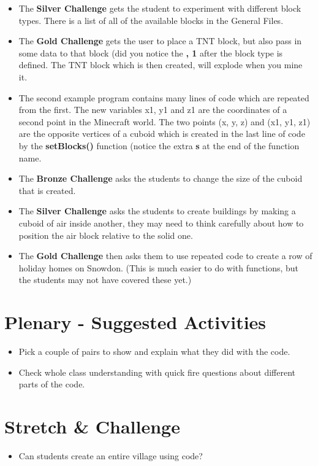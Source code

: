 \documentclass{geocraft-lesson-plan}
\begin{document}
\begin{itemize}
\item The \textbf{Silver Challenge} gets the student to experiment with different block types. There is a list of all of
  the available blocks in the General Files.
\item The \textbf{Gold Challenge} gets the user to place a TNT block, but also pass in some data to that block (did you
  notice the \textbf{, 1} after the block type is defined. The TNT block which is then created, will explode when you
  mine it.
\item The second example program contains many lines of code which are repeated from the first. The new variables x1, y1
  and z1 are the coordinates of a second point in the Minecraft world. The two points (x, y, z) and (x1, y1, z1) are the
  opposite vertices of a cuboid which is created in the last line of code by the \textbf{setBlocks()} function (notice
  the extra \textbf{s} at the end of the function name.
\item The \textbf{Bronze Challenge} asks the students to change the size of the cuboid that is created.
\item The \textbf{Silver Challenge} asks the students to create buildings by making a cuboid of air inside another, they
  may need to think carefully about how to position the air block relative to the solid one.
\item The \textbf{Gold Challenge} then asks them to use repeated code to create a row of holiday homes on Snowdon. (This
  is much easier to do with functions, but the students may not have covered these yet.)
\end{itemize}

\section*{Plenary - Suggested Activities}
\begin{itemize}
\item Pick a couple of pairs to show and explain what they did with
  the code. 
\item Check whole class understanding with quick fire questions about
  different parts of the code. 
\end{itemize}


\section*{Stretch \& Challenge}
\begin{itemize}
\item Can students create an entire village using code?
\end{itemize}
\end{document}
